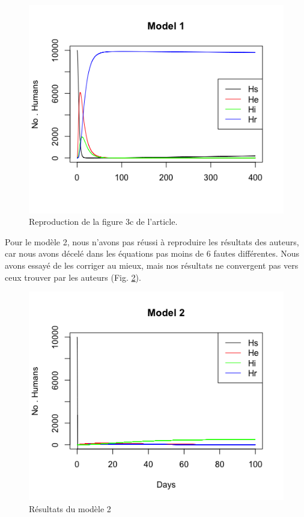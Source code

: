 \documentclass[
  12pt,
  french,
  oneside]{article}
\begin{document}
\begin{figure}
\hypertarget{fig:model1}{%
\centering
\includegraphics{figures/Model1.png}
\caption{Reproduction de la figure 3c de l'article.}\label{fig:model1}
}
\end{figure}

Pour le modèle 2, nous n'avons pas réussi à reproduire les résultats des
auteurs, car nous avons décelé dans les équations pas moins de 6 fautes
différentes. Nous avons essayé de les corriger au mieux, mais nos
résultats ne convergent pas vers ceux trouver par les auteurs (Fig.
\ref{fig:model2}).

\begin{figure}
\hypertarget{fig:model2}{%
\centering
\includegraphics{figures/Model2.png}
\caption{Résultats du modèle 2}\label{fig:model2}
}
\end{figure}
\end{document}
